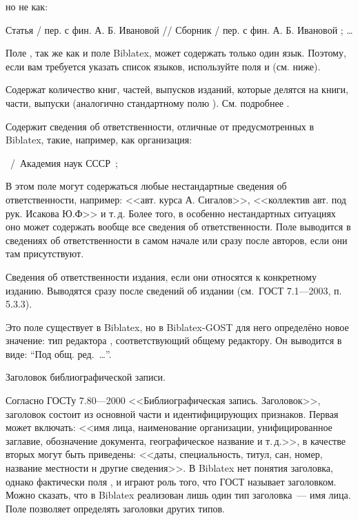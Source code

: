 \documentclass[10pt,a4paper,headings=small,numbers=enddot,english,russian]{ltxdockit}[2011/03/25]
\newcommand*{\biblatex}{Biblatex\xspace}
\newcommand*{\biblatexgost}{Biblatex-GOST\xspace}
\newcommand*{\gostbibname}[1][]{ГОСТ#1 7.1---2003}
\newcommand*{\gostbibref}[2][]{\gostbibname[#1], п.\,#2}
\newenvironment{bibexample}{\begin{list}
     {}
     {\setlength{\leftmargin}{\parindent}%
      \setlength{\itemindent}{-\leftmargin}%
      \setlength{\parsep}{0pt}}}
  {\end{list}}
\begin{document}
\begin{fieldlist}
но не как:

\begin{bibexample}
\item Статья / пер. с фин. А. Б. Ивановой // Сборник / пер. с фин. А. Б. Ивановой ; \ldots
\end{bibexample}

Поле , так же как и поле \biblatex {},
может содержать только один язык. Поэтому, если вам требуется указать список языков,
используйте поля  и  (см. ниже).


Содержат количество книг, частей, выпусков изданий,
которые делятся на книги, части, выпуски (аналогично стандартному полю ). См.
подробнее .


Содержит сведения об ответственности, отличные от предусмотренных в \biblatex,
такие, например, как организация:

\begin{bibexample}
\item \textellipsis\ \slash\ Академия наук СССР\ ;\ \textellipsis
\end{bibexample}

В этом поле могут содержаться любые нестандартные сведения об ответственности,
например: <<авт. курса А. Сигалов>>,
<<коллектив авт. под рук. Исакова Ю.Ф>> и т.\,д.
Более того, в особенно нестандартных ситуациях
оно может содержать вообще все сведения об ответственности.
Поле  выводится в сведениях об ответственности в самом начале или
сразу после авторов, если они там присутствуют.


Сведения об ответственности издания, если они относятся к конкретному изданию.
Выводятся сразу после сведений об издании (см.~\gostbibref{5.3.3}).


Это поле существует в \biblatex, но в \biblatexgost для него определёно новое значение:
тип редактора , соответствующий общему
редактору. Он выводится в виде: \enquote{Под общ. ред.~\ldots}.


Заголовок библиографической записи.

Согласно ГОСТу 7.80---2000 <<Библиографическая запись. Заголовок>>,
заголовок состоит из основной части и идентифицирующих признаков.
Первая может включать: <<имя лица, наименование организации, унифицированное
заглавие, обозначение документа, географическое название и т.\,д.>>,
в качестве вторых могут быть приведены: <<даты,
специальность, титул, сан, номер, название местности н другие сведения>>.
В \biblatex нет понятия заголовка, однако фактически поля ,  и
 играют роль того, что ГОСТ называет заголовком. Можно сказать,
что в \biblatex реализован лишь один тип заголовка~--- имя лица. Поле 
позволяет определять заголовки других типов.%


\end{fieldlist}
\end{document}
